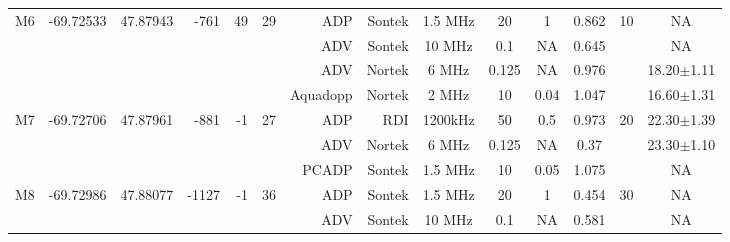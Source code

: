 \documentclass[letterpaper,10pt,landscape]{article}
\begin{document}
\begin{table}
\begin{tabular}{|r|c|c|r|r|r|r|r|c|c|c|c|c|c|}
    \multirow{4}{*}{M6} & \multirow{4}{*}{-69.72533} & \multirow{4}{*}{47.87943} & \multirow{4}{*}{-761}  & \multirow{4}{*}{49}  & \multirow{4}{*}{29} & ADP          & Sontek     & 1.5 MHz   & 20        & 1        & 0.862      & \multirow{4}{*}{10}&  NA               \\ 
    ~                   &                            &                           &                        &                      &                     & ADV          & Sontek     & 10 MHz    & 0.1       & NA       & 0.645      &                    &  NA               \\ 
    ~                   &                            &                           &                        &                      &                     & ADV          & Nortek     & 6 MHz     & 0.125     & NA       & 0.976      &                    &  18.20$\pm$1.11   \\ %
    ~                   &                            &                           &                        &                      &                     & Aquadopp     & Nortek     & 2 MHz     & 10        & 0.04     & 1.047      &                    &  16.60$\pm$1.31   \\\hline
    \multirow{3}{*}{M7} & \multirow{3}{*}{-69.72706} & \multirow{3}{*}{47.87961} & \multirow{3}{*}{-881}  & \multirow{3}{*}{-1}  & \multirow{3}{*}{27} & ADP          & RDI        & 1200kHz   & 50        & 0.5      & 0.973      & \multirow{3}{*}{20}&  22.30$\pm$1.39   \\ 
    ~                   &                            &                           &                        &                      &                     & ADV          & Nortek     & 6 MHz     & 0.125     & NA       & 0.37       &                    &  23.30$\pm$1.10   \\ %
    ~                   &                            &                           &                        &                      &                     & PCADP        & Sontek     & 1.5 MHz   & 10        & 0.05     & 1.075      &                    &  NA               \\\hline
    \multirow{4}{*}{M8} & \multirow{4}{*}{-69.72986} & \multirow{4}{*}{47.88077} & \multirow{4}{*}{-1127} & \multirow{4}{*}{-1}  & \multirow{4}{*}{36} & ADP          & Sontek     & 1.5 MHz   & 20        & 1        & 0.454      & \multirow{4}{*}{30}&  NA               \\ 
    ~                   &                            &                           &                        &                      &                     & ADV          & Sontek     & 10 MHz    & 0.1       & NA       & 0.581      &                    &  NA               \\ 

\end{tabular}
\end{table}
\end{document}
